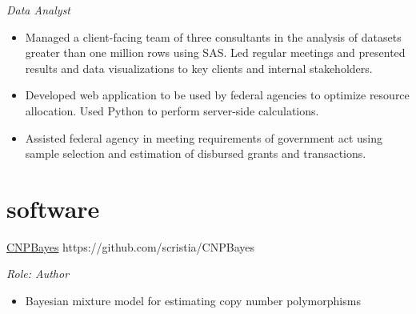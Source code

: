 \documentclass[]{friggeri-cv} %
\begin{document}
\begin{entrylist}
{\emph{Data Analyst}
\begin{itemize}
\renewcommand\labelitemi{--}
\item Managed a client-facing team of three consultants in the analysis of datasets greater than one million rows using SAS. 
Led regular meetings and presented results and data visualizations to key clients and internal stakeholders.
\item Developed web application to be used by federal agencies to optimize resource allocation. 
Used Python to perform server-side calculations.
\item Assisted federal agency in meeting requirements of government act using sample selection and estimation of disbursed grants and transactions.
\end{itemize}
}
\end{entrylist}


\section{software}
\begin{entrylist}
\entry
{}
{\href{https://github.com/scristia/CNPBayes}{CNPBayes}}
{https://github.com/scristia/CNPBayes}
{\emph{Role: Author}
\begin{itemize}
\renewcommand\labelitemi{--}
\item Bayesian mixture model for estimating copy number polymorphisms
\end{itemize}
}
\end{entrylist}
\end{document}
